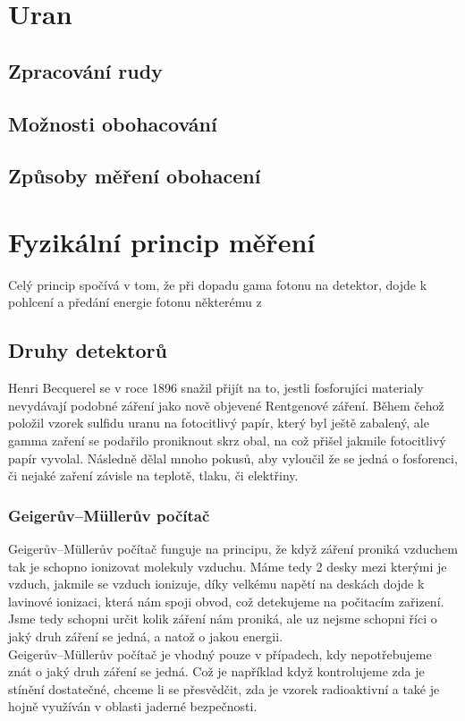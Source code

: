 \section{Uran}
\subsection{Zpracování rudy}
\subsection{Možnosti obohacování}
\subsection{Způsoby měření obohacení}

\section{Fyzikální princip měření}
Celý princip spočívá v tom, že při dopadu gama fotonu na detektor, dojde k pohlcení a předání energie fotonu některému z \e
\subsection{Druhy detektorů}
Henri Becquerel se v roce 1896 snažil přijít na to, jestli fosforujíci materialy nevydávají podobné záření jako nově objevené Rentgenové záření. Během čehož položil vzorek sulfidu uranu na fotocitlivý papír, který byl ještě zabalený, ale gamma zaření se podařilo proniknout skrz obal, na což přišel jakmile fotocitlivý papír vyvolal. Následně dělal mnoho pokusů, aby vyloučil že se jedná o fosforenci, či nejaké zaření závisle na teplotě, tlaku, či elektřiny.  \cite{Radioactivity}%

\subsubsection{Geigerův–Müllerův počítač}
Geigerův–Müllerův počítač funguje na principu, že když záření proniká vzduchem tak je schopno ionizovat molekuly vzduchu. Máme tedy 2 desky mezi kterými je vzduch, jakmile se vzduch ionizuje, díky velkému napětí na deskách dojde k lavinové ionizaci, která nám spoji obvod, což detekujeme na počitacím zařizení. Jsme tedy schopni určit kolik záření nám proniká, ale uz nejsme schopni říci o jaký druh záření se jedná, a natož o jakou energii.\\
Geigerův–Müllerův počítač je vhodný pouze v případech, kdy nepotřebujeme znát o jaký druh záření se jedná. Což je například když kontrolujeme zda je stínění dostatečné, chceme li se přesvědčit, zda je vzorek radioaktivní a také je hojně využíván v oblasti  jaderné bezpečnosti.\cite{}%
